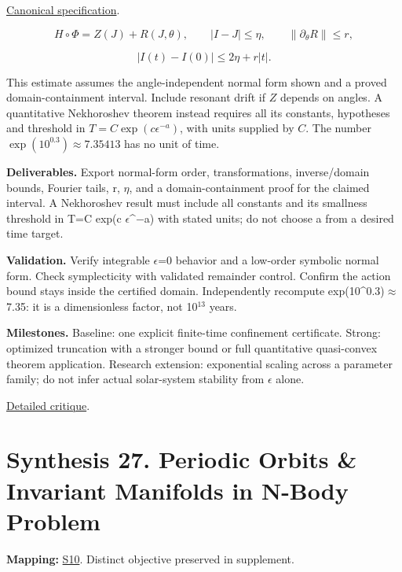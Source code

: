 \documentclass[
  11pt,
]{article}
\begin{document}
\href{https://github.com/rick-stevens-ai/Pure-Thought/blob/main/PRDs/28-Nekhoroshev-Stability-Theory.md}{Canonical
specification}.

\[H\circ\Phi=Z(J)+R(J,\theta),\qquad
|I-J|\le\eta,\qquad\|\partial_\theta R\|\le r,\]

\[|I(t)-I(0)|\le2\eta+r|t|.\]

This estimate assumes the angle-independent normal form shown and a
proved domain-containment interval. Include resonant drift if \(Z\)
depends on angles. A quantitative Nekhoroshev theorem instead requires
all its constants, hypotheses and threshold in
\(T=C\exp(c\epsilon^{-a})\), with units supplied by \(C\). The number
\(\exp(10^{0.3})\approx7.35413\) has no unit of time.

\textbf{Deliverables.} Export normal-form order, transformations,
inverse/domain bounds, Fourier tails, r, \ensuremath{\eta}, and a
domain-containment proof for the claimed interval. A Nekhoroshev result
must include all constants and its smallness threshold in T=C exp(c
\ensuremath{\epsilon}\textasciicircum{}\ensuremath{-}a) with stated
units; do not choose a from a desired time target.

\textbf{Validation.} Verify integrable \ensuremath{\epsilon}=0 behavior
and a low-order symbolic normal form. Check symplecticity with validated
remainder control. Confirm the action bound stays inside the certified
domain. Independently recompute
exp(10\textasciicircum{}0.3)\ensuremath{\approx}7.35: it is a
dimensionless factor, not 10\ensuremath{{}^{13}} years.

\textbf{Milestones.} Baseline: one explicit finite-time confinement
certificate. Strong: optimized truncation with a stronger bound or full
quantitative quasi-convex theorem application. Research extension:
exponential scaling across a parameter family; do not infer actual
solar-system stability from \ensuremath{\epsilon} alone.

\href{https://github.com/rick-stevens-ai/Pure-Thought/blob/main/reviews/28-Nekhoroshev-Stability-Theory.md}{Detailed
critique}.

\section{Synthesis 27. Periodic Orbits \& Invariant Manifolds in N-Body
Problem}

\textbf{Mapping:}
\href{https://github.com/rick-stevens-ai/Pure-Thought/blob/main/supplemental/S10.md}{S10}.
Distinct objective preserved in supplement.
\end{document}

